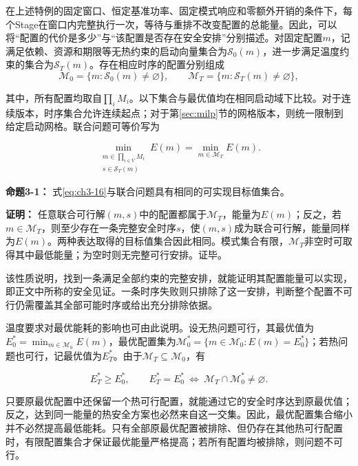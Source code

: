在上述特例的固定窗口、恒定基准功率、固定模式响应和零额外开销的条件下，每个Stage在窗口内完整执行一次，等待与重排不改变配置的总能量。因此，可以将“配置的代价是多少”与“该配置是否存在安全安排”分别描述。对固定配置\(m\)，记满足依赖、资源和期限等无热约束的启动向量集合为\(\mathcal S_0(m)\)，进一步满足温度约束的集合为\(\mathcal S_T(m)\)。存在相应时序的配置分别组成
\[
\mathcal M_0=\{m:\mathcal S_0(m)\ne\varnothing\},\qquad
\mathcal M_T=\{m:\mathcal S_T(m)\ne\varnothing\},
\]
\noindent\begin{minipage}{\linewidth}
\setlength{\parindent}{2em}
其中，所有配置均取自\(\prod_iM_i\)。以下集合与最优值均在相同启动域下比较。对于连续版本，时序集合允许连续起点；对于第\ref{sec:milp}节的网格版本，则统一限制到给定启动网格。联合问题可等价写为

\begin{equation}
\boxed{\min_{\substack{m\in\prod_{i\in V}M_i\\s\in\mathcal S_T(m)}}E(m)
=\min_{m\in\mathcal M_T}E(m).}
\label{eq:ch3-16}
\end{equation}

\textbf{命题3-1：} 式\eqref{eq:ch3-16}与联合问题具有相同的可实现目标值集合。

\textbf{证明：} 任意联合可行解\((m,s)\)中的配置都属于\(\mathcal M_T\)，能量为\(E(m)\)；反之，若\(m\in\mathcal M_T\)，则至少存在一条完整安全时序\(s\)，使\((m,s)\)成为联合可行解，能量同样为\(E(m)\)。两种表达取得的目标值集合因此相同。模式集合有限，\(\mathcal M_T\)非空时可取得其中最低能量；为空时则无完整可行安排。证毕。
\end{minipage}\par\medskip

该性质说明，找到一条满足全部约束的完整安排，就能证明其配置能量可以实现，即正文中所称的安全见证。一条时序失败则只排除了这一安排，判断整个配置不可行仍需覆盖其全部可能时序或给出充分排除依据。

温度要求对最优能耗的影响也可由此说明。设无热问题可行，其最优值为\(E_0^*=\min_{m\in\mathcal M_0}E(m)\)，最优配置集为\(\mathcal M_0^*=\{m\in\mathcal M_0:E(m)=E_0^*\}\)；若热问题也可行，记最优值为\(E_T^*\)。由于\(\mathcal M_T\subseteq\mathcal M_0\)，有

\begin{equation}
E_T^*\ge E_0^*,\qquad
E_T^*=E_0^*\ \Longleftrightarrow\ \mathcal M_T\cap\mathcal M_0^*\ne\varnothing.
\label{eq:ch3-17}
\end{equation}

只要原最优配置中还保留一个热可行配置，就能通过它的安全时序达到原最优值；反之，达到同一能量的热安全方案也必然来自这一交集。因此，最优配置集合缩小并不必然提高最低能耗。只有全部原最优配置被排除、但仍存在其他热可行配置时，有限配置集合才保证最优能量严格提高；若所有配置均被排除，则问题不可行。


